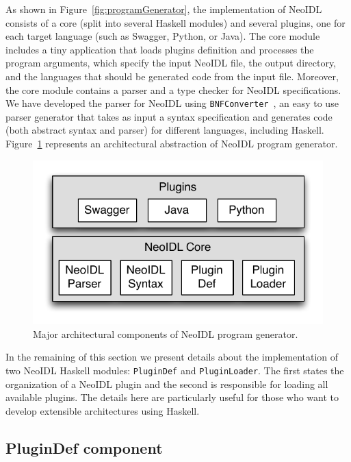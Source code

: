 \documentclass{ws-ijseke}
\newcommand{\neoidl}{NeoIDL}
\newcommand{\bnfc}{\texttt{BNFConverter}}
\begin{document}
As shown in Figure~\ref{fig:programGenerator}, the implementation of \neoidl{} consists of a core (split into
several Haskell modules) and 
several plugins, one for each target language (such as Swagger,
Python, or Java). The core module includes a tiny application that loads 
plugins definition and processes the program arguments, which 
specify the input \neoidl{} file, the output directory, and the languages that should be generated code from the 
input file. Moreover, the core module contains a
parser and a type checker for \neoidl{} specifications. 
We have developed the parser for \neoidl{} using \bnfc~\cite{ranta-bnfc:2012}, 
an easy to use parser generator that takes as
input a syntax specification and generates code (both abstract syntax and
parser) for different languages, including Haskell. Figure~\ref{fig:neoidl-architecture}
represents an architectural abstraction of \neoidl{} program
generator. 

\begin{figure}[b]
\begin{center}
\includegraphics[scale=0.6]{neoidl.pdf}
\vspace{-.5cm}
\end{center}
\caption{Major architectural components of \neoidl{} program generator.}
\label{fig:neoidl-architecture} 
\end{figure}

In the remaining of this section
we present details about the implementation of two
\neoidl{} Haskell modules: 
\texttt{PluginDef} and \texttt{PluginLoader}. The first states the
organization of a \neoidl{} plugin and the second is responsible for
loading all available plugins. The details here are
particularly useful for those who want to develop extensible architectures
using Haskell. 


\subsection{PluginDef component}{\label{sec:plugindef}}
\end{document}
